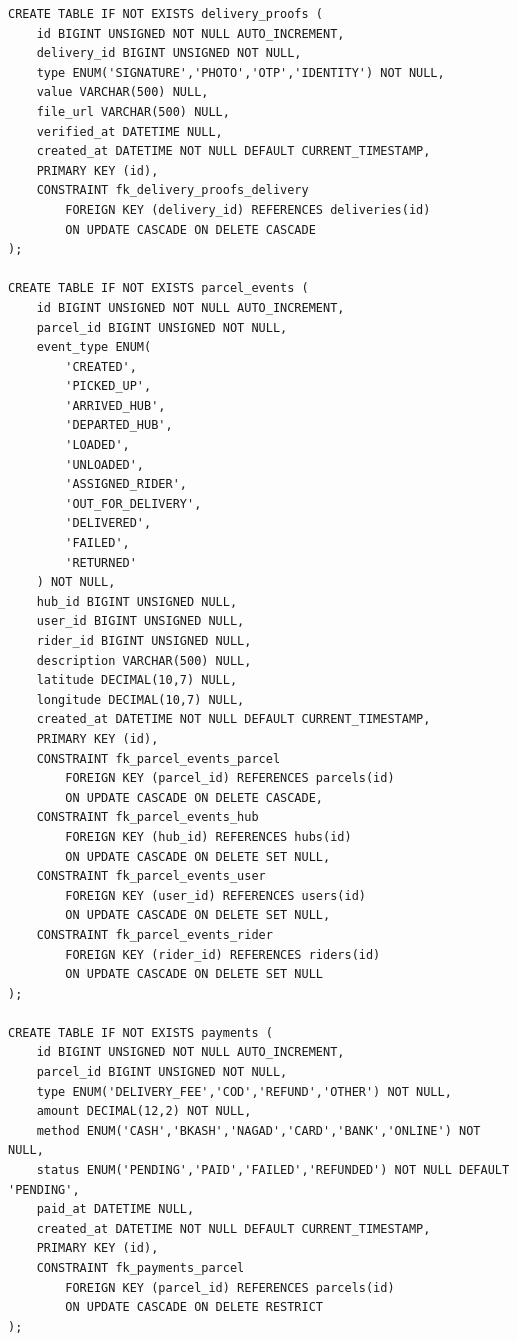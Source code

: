 \documentclass[11pt,a4paper]{article}
\begin{document}
\begin{lstlisting}
CREATE TABLE IF NOT EXISTS delivery_proofs (
    id BIGINT UNSIGNED NOT NULL AUTO_INCREMENT,
    delivery_id BIGINT UNSIGNED NOT NULL,
    type ENUM('SIGNATURE','PHOTO','OTP','IDENTITY') NOT NULL,
    value VARCHAR(500) NULL,
    file_url VARCHAR(500) NULL,
    verified_at DATETIME NULL,
    created_at DATETIME NOT NULL DEFAULT CURRENT_TIMESTAMP,
    PRIMARY KEY (id),
    CONSTRAINT fk_delivery_proofs_delivery
        FOREIGN KEY (delivery_id) REFERENCES deliveries(id)
        ON UPDATE CASCADE ON DELETE CASCADE
);

CREATE TABLE IF NOT EXISTS parcel_events (
    id BIGINT UNSIGNED NOT NULL AUTO_INCREMENT,
    parcel_id BIGINT UNSIGNED NOT NULL,
    event_type ENUM(
        'CREATED',
        'PICKED_UP',
        'ARRIVED_HUB',
        'DEPARTED_HUB',
        'LOADED',
        'UNLOADED',
        'ASSIGNED_RIDER',
        'OUT_FOR_DELIVERY',
        'DELIVERED',
        'FAILED',
        'RETURNED'
    ) NOT NULL,
    hub_id BIGINT UNSIGNED NULL,
    user_id BIGINT UNSIGNED NULL,
    rider_id BIGINT UNSIGNED NULL,
    description VARCHAR(500) NULL,
    latitude DECIMAL(10,7) NULL,
    longitude DECIMAL(10,7) NULL,
    created_at DATETIME NOT NULL DEFAULT CURRENT_TIMESTAMP,
    PRIMARY KEY (id),
    CONSTRAINT fk_parcel_events_parcel
        FOREIGN KEY (parcel_id) REFERENCES parcels(id)
        ON UPDATE CASCADE ON DELETE CASCADE,
    CONSTRAINT fk_parcel_events_hub
        FOREIGN KEY (hub_id) REFERENCES hubs(id)
        ON UPDATE CASCADE ON DELETE SET NULL,
    CONSTRAINT fk_parcel_events_user
        FOREIGN KEY (user_id) REFERENCES users(id)
        ON UPDATE CASCADE ON DELETE SET NULL,
    CONSTRAINT fk_parcel_events_rider
        FOREIGN KEY (rider_id) REFERENCES riders(id)
        ON UPDATE CASCADE ON DELETE SET NULL
);

CREATE TABLE IF NOT EXISTS payments (
    id BIGINT UNSIGNED NOT NULL AUTO_INCREMENT,
    parcel_id BIGINT UNSIGNED NOT NULL,
    type ENUM('DELIVERY_FEE','COD','REFUND','OTHER') NOT NULL,
    amount DECIMAL(12,2) NOT NULL,
    method ENUM('CASH','BKASH','NAGAD','CARD','BANK','ONLINE') NOT NULL,
    status ENUM('PENDING','PAID','FAILED','REFUNDED') NOT NULL DEFAULT 'PENDING',
    paid_at DATETIME NULL,
    created_at DATETIME NOT NULL DEFAULT CURRENT_TIMESTAMP,
    PRIMARY KEY (id),
    CONSTRAINT fk_payments_parcel
        FOREIGN KEY (parcel_id) REFERENCES parcels(id)
        ON UPDATE CASCADE ON DELETE RESTRICT
);


\end{lstlisting}
\end{document}
